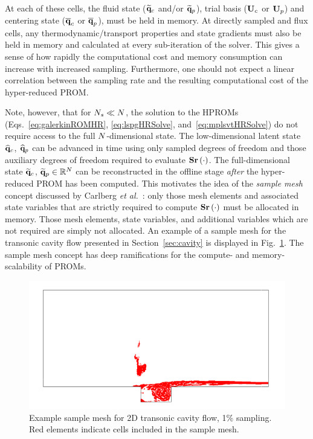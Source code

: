 At each of these cells, the fluid state ($\mathbf{\widetilde{q}}_{c}$ and/or $\mathbf{\widetilde{q}}_{p}$), trial basis ($\consTrial$ or $\primTrial$) and centering state ($\mathbf{\overline{q}}_{c}$ or $\mathbf{\overline{q}}_{p}$), must be held in memory. At directly sampled and flux cells, any thermodynamic/transport properties and state gradients must also be held in memory and calculated at every sub-iteration of the solver. This gives a sense of how rapidly the computational cost and memory consumption can increase with increased sampling. Furthermore, one should not expect a linear correlation between the sampling rate and the resulting computational cost of the hyper-reduced PROM.

Note, however, that for $N_s \ll N$, the solution to the HPROMs (Eqs.~\ref{eq:galerkinROMHR}, \ref{eq:lspgHRSolve}, and~\ref{eq:mplsvtHRSolve}) do not require access to the full $N$-dimensional state. The low-dimensional latent state $\mathbf{\widehat{q}}_{c}$, $\mathbf{\widehat{q}}_{p}$ can be advanced in time using only sampled degrees of freedom and those auxiliary degrees of freedom required to evaluate $\mathbf{S} \mathbf{r}\left(\cdot\right)$. The full-dimensional state $\mathbf{\widetilde{q}}_{c}$, $\mathbf{\widetilde{q}}_{p} \in \mathbb{R}^{N}$ can be reconstructed in the offline stage \textit{after} the hyper-reduced PROM has been computed. This motivates the idea of the \textit{sample mesh} concept discussed by Carlberg \textit{et al.}~\cite{Carlberg2013}: only those mesh elements and associated state variables that are strictly required to compute $\mathbf{S} \mathbf{r}\left(\cdot\right)$ must be allocated in memory. Those mesh elements, state variables, and additional variables which are not required are simply not allocated. An example of a sample mesh for the transonic cavity flow presented in Section~\ref{sec:cavity} is displayed in Fig.~\ref{fig:sampMeshExample}. The sample mesh concept has deep ramifications for the compute- and memory-scalability of PROMs.

\begin{figure}
	\centering
	\includegraphics[width=0.75\linewidth]{Chapters/HPROMs/Images/cavity_sample_mesh.png}
	\caption{\label{fig:sampMeshExample}Example sample mesh for 2D transonic cavity flow, 1\% sampling. Red elements indicate cells included in the sample mesh.}
\end{figure}

